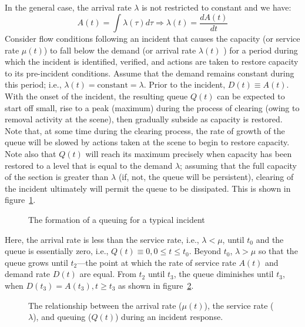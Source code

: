 \documentclass[12pt]{report}
\newcommand{\inputTikZ}[1]{%
  }
\newcommand{\inputTikZ}[1]{%
    \beginpgfgraphicnamed{#1-external}%
    \endpgfgraphicnamed%
  }
\begin{document}
In the general case, the arrival rate $\lambda$ is not restricted to constant and we have:
\begin{equation*}
  \label{eq:gen-arr}
  A(t) = \int\lambda(\tau)d\tau \Rightarrow \lambda(t) = \frac{dA(t)}{dt} 
\end{equation*}
Consider flow conditions following an incident that causes the
capacity (or service rate $\mu(t)$) to fall below the demand (or
arrival rate $\lambda(t)$ ) for a period during which the incident is
identified, verified, and actions are taken to restore capacity to its
pre-incident conditions.  Assume that the demand remains constant
during this period; i.e., $\lambda(t) = \mathrm{constant} = \lambda$.
Prior to the incident, $D(t) \equiv A(t)$.  With the onset of the
incident, the resulting queue $Q(t)$ can be expected to start off
small, rise to a peak (maximum) during the process of clearing (owing
to removal activity at the scene), then gradually subside as capacity
is restored. Note that, at some time during the clearing process, the
rate of growth of the queue will be slowed by actions taken at the
scene to begin to restore capacity. Note also that $Q(t)$ will reach
its maximum precisely when capacity has been restored to a level that
is equal to the demand $\lambda$; assuming that the full capacity of
the section is greater than $\lambda$ (if, not, the queue will be
persistent), clearing of the incident ultimately will permit the queue
to be dissipated. This is shown in
figure~\ref{fig:general-incident-queuing}.
\begin{figure}[tbp]
  \begin{center}
    \inputTikZ{figs/queuing-formation-for-typical-incident}
    \caption{The formation of a queuing for a typical incident}
    \label{fig:general-incident-queuing} 
  \end{center}
\end{figure}

Here, the arrival rate is less than the service rate, i.e., $\lambda <
\mu$, until $t_0$ and the queue is essentially zero, i.e., $Q(t)
\equiv 0, 0 \le t \le t_0$. Beyond $t_0$, $\lambda > \mu$ so that the
queue grows until $t_2$---the point at which the rate of service rate
$A(t)$ and demand rate $D(t)$ are equal.  From $t_2$ until $t_3$, the
queue diminishes until $t_3$, when $D(t_3) = A(t_3), t \ge t_3$ as
shown in figure~\ref{fig:arrival-service-and-queuing}.
\begin{figure}[tbp]
  \begin{center}
    \inputTikZ{figs/arrival-service-and-queuing}
    \caption[The relationship between the arrival rate, the service
    rate, and queuing during an incident response]{The relationship
      between the arrival rate ($\mu(t)$), the service rate
      ($\lambda$), and queuing ($Q(t)$) during an incident response.}
    \label{fig:arrival-service-and-queuing}
  \end{center}
\end{figure}
\end{document}
